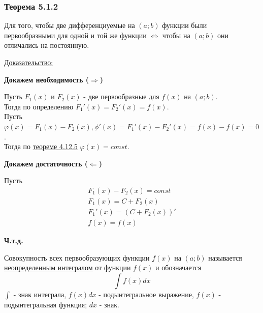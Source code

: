 \documentclass[12pt]{article}
\begin{document}
    \subsubsection*{Теорема 5.1.2}\label{th:5.1.2}
    Для того, чтобы две дифференциуемые на $(a;b)$ функции были первообразными для одной и той же функции $\Leftrightarrow$ чтобы на $(a; b)$ они отличались на постоянную.\par\noindent
    \underline{Доказательство:}
    \begin{adjustwidth}{1.5em}{1.5em}
        \textbf{Докажем необходимость ($\Rightarrow$)}\par\noindent
        Пусть $F_1(x)$ и $F_2(x)$ - две первообразные для $f(x)$ на $(a; b)$.\\
        Тогда по определению $F_1'(x) = F_2'(x) = f(x)$.\\
        Пусть $\varphi(x) = F_1(x) - F_2(x), \phi'(x) = F_1'(x) - F_2'(x) = f(x) - f(x) = 0$.\\
        Тогда по \hyperref[th:4.12.5]{теореме 4.12.5} $\varphi(x) = const$.\par\noindent
        
        \textbf{Докажем достаточность ($\Leftarrow$)}\par\noindent
        Пусть
        \begin{gather*}
            F_1(x) - F_2(x) = const\\
            F_1(x) = C + F_2(x)\\
            F_1'(x) = (C + F_2(x))'\\
            f(x) = f(x)
        \end{gather*}
        \begin{center}
            \textbf{Ч.т.д.}
        \end{center}
    \end{adjustwidth}
    Совокупность всех первообразующих функции $f(x)$ на $(a; b)$ называется \underline{неопределенным интегралом} от функции $f(x)$ и обозначается 
    \[ \int f(x)dx \]
    $\int$ - знак интеграла, $f(x)dx$ - подынтегральное выражение, $f(x)$ - подынтегральная функция; $dx$ - знак.
    
\end{document}
